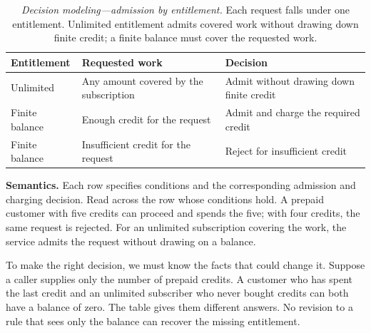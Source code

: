 {\footnotesize
\begin{longtable}[]{@{}
  >{\raggedright\arraybackslash}p{}
  >{\raggedright\arraybackslash}p{}
  >{\raggedright\arraybackslash}p{}@{}}
\caption[Decision modeling---admission by entitlement]{\emph{Decision modeling---admission by entitlement.} Each request falls under one entitlement. Unlimited entitlement admits covered work without drawing down finite credit; a finite balance must cover the requested work.}\label{simple-admission-policy}\tabularnewline
\toprule\noalign{}
\begin{minipage}[b]{\linewidth}\raggedright
Entitlement
\end{minipage} & \begin{minipage}[b]{\linewidth}\raggedright
Requested work
\end{minipage} & \begin{minipage}[b]{\linewidth}\raggedright
Decision
\end{minipage} \\
\midrule\noalign{}
\endhead
\bottomrule\noalign{}
\endlastfoot
Unlimited & Any amount covered by the subscription & Admit without drawing down finite credit \\
Finite balance & Enough credit for the request & Admit and charge the required credit \\
Finite balance & Insufficient credit for the request & Reject for insufficient credit \\
\end{longtable}
}

\textbf{Semantics.} Each row specifies conditions and the corresponding admission and charging decision. Read across the row whose conditions hold. A prepaid customer with five credits can proceed and spends the five; with four credits, the same request is rejected. For an unlimited subscription covering the work, the service admits the request without drawing on a balance.

To make the right decision, we must know the facts that could change it. Suppose a caller supplies only the number of prepaid credits. A customer who has spent the last credit and an unlimited subscriber who never bought credits can both have a balance of zero. The table gives them different answers. No revision to a rule that sees only the balance can recover the missing entitlement.


